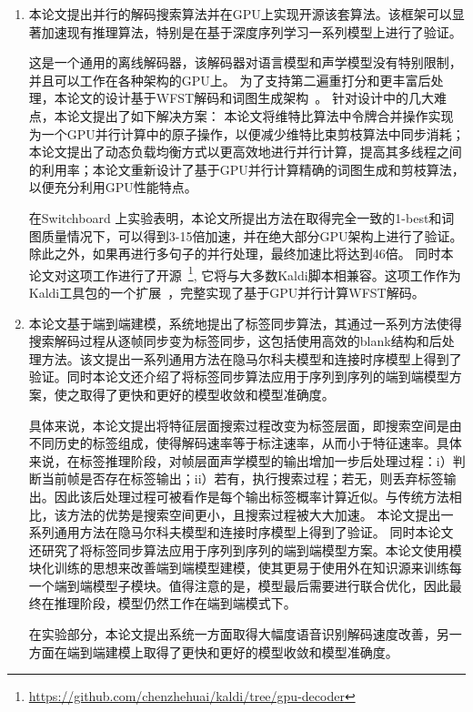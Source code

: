 \begin{enumerate}
    \item 
本论文提出并行的解码搜索算法并在GPU上实现开源该套算法。该框架可以显著加速现有推理算法，特别是在基于深度序列学习一系列模型上进行了验证。

这是一个通用的离线解码器，该解码器对语言模型和声学模型没有特别限制，并且可以工作在各种架构的GPU上。
为了支持第二遍重打分和更丰富后处理，本论文的设计基于WFST解码和词图生成架构~\cite{povey2012generating}。
针对设计中的几大难点，本论文提出了如下解决方案：
本论文将维特比算法中令牌合并操作实现为一个GPU并行计算中的原子操作，以便减少维特比束剪枝算法中同步消耗；本论文提出了动态负载均衡方式以更高效地进行并行计算，提高其多线程之间的利用率；本论文重新设计了基于GPU并行计算精确的词图生成和剪枝算法，以便充分利用GPU性能特点。

在Switchboard 上实验表明，本论文所提出方法在取得完全一致的1-best和词图质量情况下，可以得到3-15倍加速，并在绝大部分GPU架构上进行了验证。除此之外，如果再进行多句子的并行处理，最终加速比将达到46倍。
同时本论文对这项工作进行了开源~\footnote{\url{https://github.com/chenzhehuai/kaldi/tree/gpu-decoder}},
它将与大多数Kaldi脚本相兼容。这项工作作为Kaldi工具包的一个扩展~\cite{povey2011kaldi}，完整实现了基于GPU并行计算WFST解码。

\item 本论文基于端到端建模，系统地提出了标签同步算法，其通过一系列方法使得搜索解码过程从逐帧同步变为标签同步，这包括使用高效的blank结构和后处理方法。该文提出一系列通用方法在隐马尔科夫模型和连接时序模型上得到了验证。同时本论文还介绍了将标签同步算法应用于序列到序列的端到端模型方案，使之取得了更快和更好的模型收敛和模型准确度。

具体来说，本论文提出将特征层面搜索过程改变为标签层面，即搜索空间是由不同历史的标签组成，使得解码速率等于标注速率，从而小于特征速率。具体来说，在标签推理阶段，对帧层面声学模型的输出增加一步后处理过程：i）判断当前帧是否存在标签输出；ii）若有，执行搜索过程；若无，则丢弃标签输出。因此该后处理过程可被看作是每个输出标签概率计算近似。与传统方法相比，该方法的优势是搜索空间更小，且搜索过程被大大加速。
本论文提出一系列通用方法在隐马尔科夫模型和连接时序模型上得到了验证。
%
同时本论文还研究了将标签同步算法应用于序列到序列的端到端模型方案。本论文使用模块化训练的思想来改善端到端模型建模，使其更易于使用外在知识源来训练每一个端到端模型子模块。值得注意的是，模型最后需要进行联合优化，因此最终在推理阶段，模型仍然工作在端到端模式下。

在实验部分，本论文提出系统一方面取得大幅度语音识别解码速度改善，另一方面在端到端建模上取得了更快和更好的模型收敛和模型准确度。


\end{enumerate}
